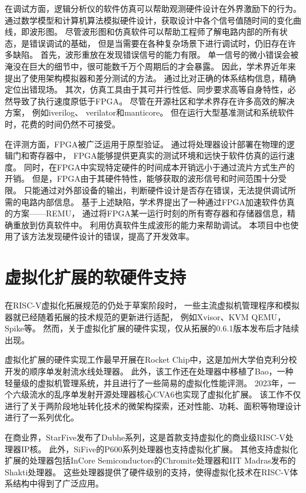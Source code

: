 在调试方面，逻辑分析仪的软件仿真可以帮助观测硬件设计在外界激励下的行为。
通过数学模型和计算机算法模拟硬件设计，获取设计中各个信号值随时间的变化曲线，即波形图。
尽管波形图和仿真软件可以帮助工程师了解电路内部的所有状态，是错误调试的基础，
但是当需要在各种复杂场景下进行调试时，仍旧存在许多缺陷。
首先，波形重放在发现错误信号的能力有限。
单一信号的微小错误会被淹没在巨大的细节中，很可能数千万个周期后的才会暴露。
因此，学术界近年来提出了使用架构模拟器和差分测试的方法\cite{micro2022xiangshan}。
通过比对正确的体系结构信息，精确定位出错现场。
其次，仿真工具由于其可并行性低、同步要求高等自身特性，必然导致了执行速度原低于FPGA。
尽管在开源社区和学术界存在许多高效的解决方案，
例如iverilog\cite{github:iverilog}、
verilator\cite{github:verilator}和manticore\cite{asplso23manticore}。
但在运行大型基准测试和系统软件时，花费的时间仍然不可接受。

在评测方面，FPGA被广泛运用于原型验证。
通过将处理器设计部署在物理的逻辑门和寄存器中，
FPGA能够提供更真实的测试环境和远快于软件仿真的运行速度。
同时，在FPGA中实现特定硬件的时间成本开销远小于通过流片方式生产的开销。
但是，FPGA由于其硬件特性，能够获取的波形信号和时间范围十分受限。
只能通过对外部设备的输出，判断硬件设计是否存在错误，无法提供调试所需的电路内部信息。
基于上述缺陷，学术界提出了一种通过FPGA加速软件仿真的方案——REMU\cite{iccd2023remu}，
通过将FPGA某一运行时刻的所有寄存器和存储器信息，精确重放到仿真软件中。
利用仿真软件生成波形的能力来帮助调试。
本项目中也使用了该方法发现硬件设计的错误，提高了开发效率。

\section{虚拟化扩展的软硬件支持}
在RISC-V虚拟化拓展规范的仍处于草案阶段时，
一些主流虚拟机管理程序和模拟器就已经随着拓展的技术规范的更新进行适配，
例如Xvisor\cite{micro2022xiangshan}、KVM\cite{kvm:H-ext}
QEMU\cite{qemu-riscv:H-ext}，Spike\cite{github:spike}等。
然而，关于虚拟化扩展的硬件实现，仅从拓展的0.6.1版本发布后才陆续出现。

虚拟化扩展的硬件实现工作最早开展在Rocket Chip\cite{itco2022rocket}中，这是加州大学伯克利分校开发的顺序单发射流水线处理器。
此外，该工作还在处理器中移植了Bao，一种轻量级的虚拟机管理系统\cite{ng-res2020bao}，并且进行了一些简易的虚拟化性能评测。
2023年，一个六级流水的乱序单发射开源处理器核心CVA6\cite{tvlsi2023cva6}也实现了虚拟化扩展。
该工作不仅进行了关于两阶段地址转化技术的微架构探索，还对性能、功耗、面积等物理设计进行了一系列优化。

在商业界，StarFive发布了Dubhe系列，这是首款支持虚拟化的商业级RISC-V处理器IP核。
此外，SiFive的P600系列处理器也支持虚拟化扩展。
其他支持虚拟化扩展的处理器包括InCore Semiconductors的Chromite处理器和IIT Madras发布的Shakti处理器。
这些处理器提供了硬件级别的支持，使得虚拟化技术在RISC-V体系结构中得到了广泛应用。

